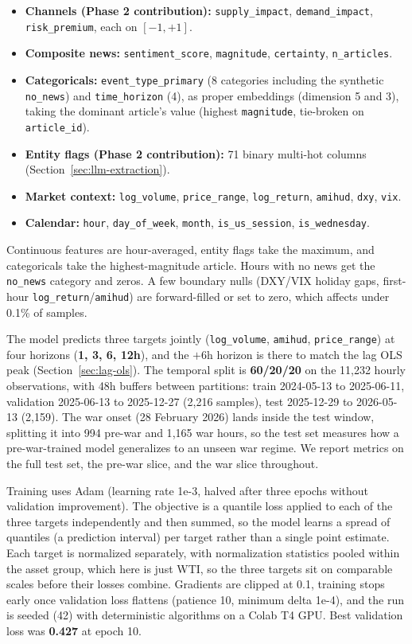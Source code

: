 \begin{itemize}
  \item \textbf{Channels (Phase 2 contribution):} \texttt{supply\_impact}, \texttt{demand\_impact}, \texttt{risk\_premium}, each on $[-1, +1]$.
  \item \textbf{Composite news:} \texttt{sentiment\_score}, \texttt{magnitude}, \texttt{certainty}, \texttt{n\_articles}.
  \item \textbf{Categoricals:} \texttt{event\_type\_primary} (8 categories including the synthetic \texttt{no\_news}) and \texttt{time\_horizon} (4), as proper embeddings (dimension 5 and 3), taking the dominant article's value (highest \texttt{magnitude}, tie-broken on \texttt{article\_id}).
  \item \textbf{Entity flags (Phase 2 contribution):} 71 binary multi-hot columns (Section~\ref{sec:llm-extraction}).
  \item \textbf{Market context:} \texttt{log\_volume}, \texttt{price\_range}, \texttt{log\_return}, \texttt{amihud}, \texttt{dxy}, \texttt{vix}.
  \item \textbf{Calendar:} \texttt{hour}, \texttt{day\_of\_week}, \texttt{month}, \texttt{is\_us\_session}, \texttt{is\_wednesday}.
\end{itemize}

Continuous features are hour-averaged, entity flags take the maximum, and categoricals take the highest-magnitude article. Hours with no news get the \texttt{no\_news} category and zeros. A few boundary nulls (DXY/VIX holiday gaps, first-hour \texttt{log\_return}/\texttt{amihud}) are forward-filled or set to zero, which affects under 0.1\% of samples.

The model predicts three targets jointly (\texttt{log\_volume}, \texttt{amihud}, \texttt{price\_range}) at four horizons (\textbf{1, 3, 6, 12h}), and the $+6$h horizon is there to match the lag OLS peak (Section~\ref{sec:lag-ols}). The temporal split is \textbf{60/20/20} on the 11{,}232 hourly observations, with 48h buffers between partitions: train 2024-05-13 to 2025-06-11, validation 2025-06-13 to 2025-12-27 (2{,}216 samples), test 2025-12-29 to 2026-05-13 (2{,}159). The war onset (28 February 2026) lands inside the test window, splitting it into 994 pre-war and 1{,}165 war hours, so the test set measures how a pre-war-trained model generalizes to an unseen war regime. We report metrics on the full test set, the pre-war slice, and the war slice throughout.

Training uses Adam (learning rate 1e-3, halved after three epochs without validation improvement). The objective is a quantile loss applied to each of the three targets independently and then summed, so the model learns a spread of quantiles (a prediction interval) per target rather than a single point estimate. Each target is normalized separately, with normalization statistics pooled within the asset group, which here is just WTI, so the three targets sit on comparable scales before their losses combine. Gradients are clipped at 0.1, training stops early once validation loss flattens (patience 10, minimum delta 1e-4), and the run is seeded (42) with deterministic algorithms on a Colab T4 GPU. Best validation loss was \textbf{0.427} at epoch 10.

